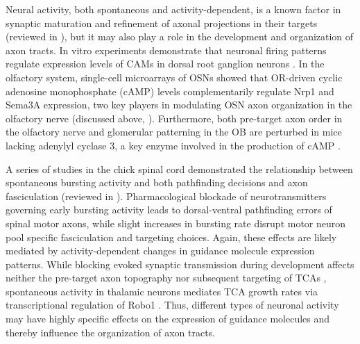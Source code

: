 Neural activity, both spontaneous and activity-dependent, is a known factor in synaptic maturation and refinement of axonal projections in their targets (reviewed in \cite{zhang2001electrical}), but it may also play a role in the development and organization of axon tracts.
In vitro experiments demonstrate that neuronal firing patterns regulate expression levels of CAMs in dorsal root ganglion neurons \cite{itoh1997activity}.
In the olfactory system, single-cell microarrays of OSNs showed that OR-driven cyclic adenosine monophosphate (cAMP) levels complementarily regulate Nrp1 and Sema3A expression, two key players in modulating OSN axon organization in the olfactory nerve (discussed above, \cite{imai2009pre}).
Furthermore, both pre-target axon order in the olfactory nerve and glomerular patterning in the OB are perturbed in mice lacking adenylyl cyclase 3, a key enzyme involved in the production of cAMP \cite{miller2010axon}.

A series of studies in the chick spinal cord demonstrated the relationship between spontaneous bursting activity and both pathfinding decisions and axon fasciculation (reviewed in \cite{hanson2008spontaneous}).
Pharmacological blockade of neurotransmitters governing early bursting activity leads to dorsal-ventral pathfinding errors of spinal motor axons, while slight increases in bursting rate disrupt motor neuron pool specific fasciculation and targeting choices.
Again, these effects are likely mediated by activity-dependent changes in guidance molecule expression patterns.
While blocking evoked synaptic transmission during development affects neither the pre-target axon topography nor subsequent targeting of TCAs \cite{molnar2002normal}, spontaneous activity in thalamic neurons mediates TCA growth rates via transcriptional regulation of Robo1 \cite{mire2012spontaneous}.
Thus, different types of neuronal activity may have highly specific effects on the expression of guidance molecules and thereby influence the organization of axon tracts.
